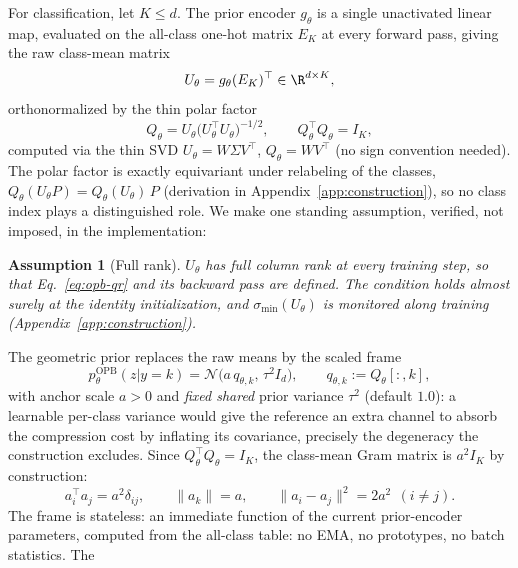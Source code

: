 \documentclass{article} %
\theoremstyle{plain}
\newtheorem{assumption}{Assumption}[section]
\theoremstyle{remark}
\begin{document}
For classification, let $K \le d$. The prior encoder $g_\theta$ is a single
unactivated linear map, evaluated on the all-class one-hot matrix $E_K$ at every
forward pass, giving the raw class-mean matrix
\begin{equation}
U_\theta = g_\theta(E_K)^{\top} \in \R^{d \times K} ,
\label{eq:opb-raw}
\end{equation}
orthonormalized by the thin polar factor
\begin{equation}
Q_\theta = U_\theta \bigl( U_\theta^{\top} U_\theta \bigr)^{-1/2},
\qquad
Q_\theta^{\top} Q_\theta = I_K,
\label{eq:opb-qr}
\end{equation}
computed via the thin SVD $U_\theta = W \Sigma V^{\top}$, $Q_\theta = W V^{\top}$ (no
sign convention needed). The polar factor is exactly equivariant under relabeling of
the classes, $Q_\theta(U_\theta P) = Q_\theta(U_\theta)\,P$ (derivation in
Appendix~\ref{app:construction}), so no class index plays a distinguished role. We
make one standing assumption, verified, not imposed, in the implementation:
\begin{assumption}[Full rank]
\label{ass:fullrank}
$U_\theta$ has full column rank at every training step, so that
Eq.~\eqref{eq:opb-qr} and its backward pass are defined. The condition holds almost
surely at the identity initialization, and $\sigma_{\min}(U_\theta)$ is monitored
along training (Appendix~\ref{app:construction}).
\end{assumption}
The geometric prior replaces the raw means by the scaled frame
\begin{equation}
p_\theta^{\mathrm{OPB}}(z|y=k)
= \mathcal{N}\bigl(a\,q_{\theta,k},\, \tau^2 I_d\bigr),
\qquad
q_{\theta,k} := Q_\theta[:, k] ,
\label{eq:opb-prior}
\end{equation}
with anchor scale $a > 0$ and \emph{fixed shared} prior variance $\tau^2$ (default
$1.0$): a learnable per-class variance would give the reference an extra channel to
absorb the compression cost by inflating its covariance, precisely the degeneracy
the construction excludes. Since $Q_\theta^{\top}Q_\theta = I_K$, the class-mean Gram
matrix is $a^2 I_K$ by construction:
\begin{equation}
a_i^{\top} a_j = a^2 \delta_{ij},
\qquad
\|a_k\| = a,
\qquad
\|a_i - a_j\|^2 = 2a^2 \ \ (i \ne j) .
\label{eq:opb-geometry}
\end{equation}
The frame is stateless: an immediate function of the current prior-encoder parameters,
computed from the all-class table: no EMA, no prototypes, no batch statistics. The
\end{document}
